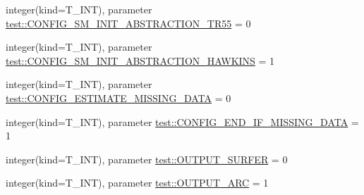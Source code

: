 \begin{DoxyCompactItemize}
integer(kind=T\_\-INT), parameter \hyperlink{namespacetest_a8021cee63a2d97e255d88e15f412eb56}{test::CONFIG\_\-SM\_\-INIT\_\-ABSTRACTION\_\-TR55} = 0
\item 
integer(kind=T\_\-INT), parameter \hyperlink{namespacetest_ad42c9ade45d8d8085a2fd417fe22878a}{test::CONFIG\_\-SM\_\-INIT\_\-ABSTRACTION\_\-HAWKINS} = 1
\item 
integer(kind=T\_\-INT), parameter \hyperlink{namespacetest_a9cfe4d8cc45e7a6425b6484a7907ffbd}{test::CONFIG\_\-ESTIMATE\_\-MISSING\_\-DATA} = 0
\item 
integer(kind=T\_\-INT), parameter \hyperlink{namespacetest_a06fa73fa08fb7cb44b868aead4d77a73}{test::CONFIG\_\-END\_\-IF\_\-MISSING\_\-DATA} = 1
\item 
integer(kind=T\_\-INT), parameter \hyperlink{namespacetest_a19efe476537676b4902cb464d566af6f}{test::OUTPUT\_\-SURFER} = 0
\item 
integer(kind=T\_\-INT), parameter \hyperlink{namespacetest_ada8330c2643deca7d4e85ce248e3e941}{test::OUTPUT\_\-ARC} = 1
\end{DoxyCompactItemize}
